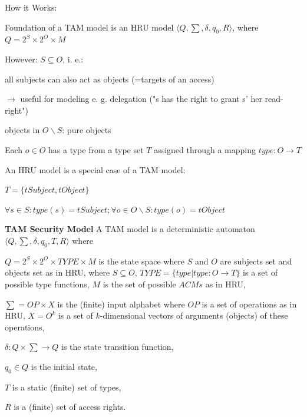 \documentclass[a4paper]{article}
\renewcommand{\note}[2]{\begin{noteBox} \textbf{#1} #2 \end{noteBox}}
\begin{document}
\begin{multicols}{3}
    How it Works:
    \begin{itemize*}
        \item Foundation of a TAM model is an HRU model $⟨Q,\sum,\delta,q_0 ,R⟩$, where $Q= 2^S\times 2^O\times M$
        \item However: $S\subseteq O$, i. e.:
        \begin{itemize*}
            \item all subjects can also act as objects (=targets of an access)
            \item $\rightarrow$  useful for modeling e. g. delegation ("s has the right to grant s' her read-right")
            \item objects in $O\backslash S$: pure objects
        \end{itemize*}
        \item Each $o\in O$ has a type from a type set $T$ assigned through a mapping $type:O\rightarrow T$
        \item An HRU model is a special case of a TAM model:
        \begin{itemize*}
            \item $T=\{tSubject,tObject\}$
            \item $\forall s\in S:type(s)=tSubject; \forall o\in O\backslash S:type(o)=tObject$
        \end{itemize*}
    \end{itemize*}

    \note{TAM Security Model}{A TAM model is a deterministic automaton $⟨Q,\sum,\delta,q_0 ,T,R⟩$ where
        \begin{itemize*}
            \item $Q= 2^S\times 2^O\times TYPE\times M$ is the state space where $S$ and $O$ are subjects set and objects set as in HRU, where $S\subseteq O$, $TYPE=\{type|type:O\rightarrow T\}$ is a set of possible type functions, $M$ is the set of possible $ACMs$ as in HRU,
            \item $\sum=OP\times X$ is the (finite) input alphabet where $OP$ is a set of operations as in HRU, $X=O^k$ is a set of $k$-dimensional vectors of arguments (objects) of these operations,
            \item $\delta:Q\times\sum\rightarrow Q$ is the state transition function,
            \item $q_0\in Q$ is the initial state,
            \item $T$ is a static (finite) set of types,
            \item $R$ is a (finite) set of access rights.
        \end{itemize*}
    }


\end{multicols}
\end{document}

